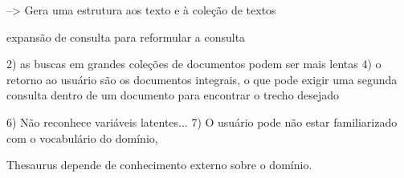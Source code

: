 --> Gera uma estrutura aos texto e à coleção de textos



expansão de consulta para reformular a consulta

2) as buscas em grandes coleções de documentos podem ser mais lentas 
4) o retorno ao usuário são os documentos integrais, o que pode exigir uma segunda consulta dentro de um documento para encontrar o trecho desejado


6) Não reconhece variáveis latentes...
7) O usuário pode não estar familiarizado com o vocabulário do domínio, %

Thesaurus depende de conhecimento externo sobre o domínio.










